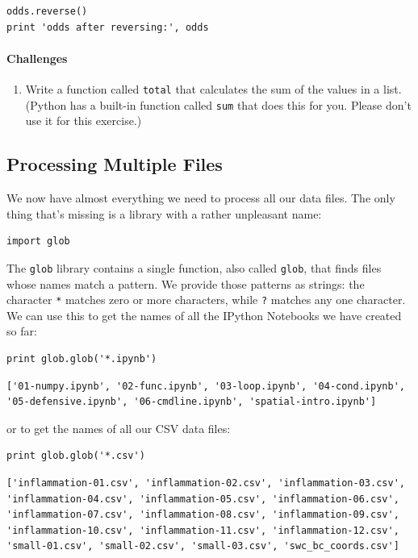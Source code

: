\documentclass[]{book}
\begin{document}
\begin{verbatim}
odds.reverse()
print 'odds after reversing:', odds
\end{verbatim}

\mbox{}\paragraph{Challenges}

\begin{enumerate}
\item
  Write a function called \texttt{total} that calculates the sum of the
  values in a list. (Python has a built-in function called \texttt{sum}
  that does this for you. Please don't use it for this exercise.)
\end{enumerate}

\subsection{Processing Multiple Files}

We now have almost everything we need to process all our data files. The
only thing that's missing is a library with a rather unpleasant name:

\begin{verbatim}
import glob
\end{verbatim}

The \texttt{glob} library contains a single function, also called
\texttt{glob}, that finds files whose names match a pattern. We provide
those patterns as strings: the character \texttt{*} matches zero or more
characters, while \texttt{?} matches any one character. We can use this
to get the names of all the IPython Notebooks we have created so far:

\begin{verbatim}
print glob.glob('*.ipynb')
\end{verbatim}

\begin{verbatim}
['01-numpy.ipynb', '02-func.ipynb', '03-loop.ipynb', '04-cond.ipynb', '05-defensive.ipynb', '06-cmdline.ipynb', 'spatial-intro.ipynb']
\end{verbatim}

or to get the names of all our CSV data files:

\begin{verbatim}
print glob.glob('*.csv')
\end{verbatim}

\begin{verbatim}
['inflammation-01.csv', 'inflammation-02.csv', 'inflammation-03.csv', 'inflammation-04.csv', 'inflammation-05.csv', 'inflammation-06.csv', 'inflammation-07.csv', 'inflammation-08.csv', 'inflammation-09.csv', 'inflammation-10.csv', 'inflammation-11.csv', 'inflammation-12.csv', 'small-01.csv', 'small-02.csv', 'small-03.csv', 'swc_bc_coords.csv']
\end{verbatim}
\end{document}
